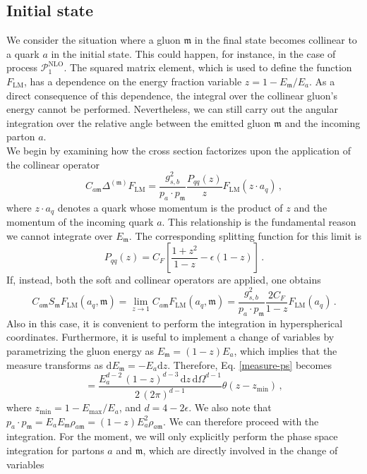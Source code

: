 \documentclass[a4paper, 12pt]{book}
\newcommand{\um}{\mathfrak{m}}
\begin{document}
\subsection{Initial state}
We consider the situation where a gluon $\um$ in the final state becomes collinear to a quark $a$ in the initial state. This could happen, for instance, in the case of process $\mathcal{P}_1^{\mathrm{NLO}}$. The squared matrix element, which is used to define the function $F_{\mathrm{LM}}$, has a dependence on the energy fraction variable $z=1-E_\um/E_a$. As a direct consequence of this dependence, the integral over the collinear gluon's energy cannot be performed. Nevertheless, we can still carry out the angular integration over the relative angle between the emitted gluon $\um$ and the incoming parton $a$. \\
We begin by examining how the cross section factorizes upon the application of the collinear operator
\begin{equation}
  C_{a\um} \Delta^{(\um)} F_{\mathrm{LM}} = \frac{g^2_{s,b}}{p_a \cdot p_\um} \frac{P_{qq}(z)}{z} F_{\mathrm{LM}}(z\cdot a_q) \, ,
\end{equation}
where $z \cdot a_q$ denotes a quark whose momentum is the product of $z$ and the momentum of the incoming quark $a$. This relationship is the fundamental reason we cannot integrate over $E_\um$. The corresponding splitting function for this limit is
\begin{equation}
  P_{qq}(z) = C_F \left[\frac{1+z^2}{1-z}-\epsilon(1-z)\right]\, .
\end{equation}
If, instead, both the soft and collinear operators are applied, one obtains
\begin{equation}
  C_{a\um} S_{\um} F_{\mathrm{LM}} (a_q, \um) = \lim_{z \to 1}  C_{a\um} F_{\mathrm{LM}} (a_q, \um)= \frac{g^2_{s,b}}{p_a \cdot p_\um} \frac{2 C_F}{1-z} F_{\mathrm{LM}}( a_q) \, .
\end{equation}
Also in this case, it is convenient to perform the integration in hyperspherical coordinates. Furthermore, it is useful to implement a change of variables by parametrizing the gluon energy as $E_\um = (1-z)E_a$, which implies that the measure transforms as $\mathrm{d}E_\um=-E_a \mathrm{d}z$. Therefore, Eq. \ref{measure-ps} becomes
\begin{equation}
  [\mathrm{d}p_\um] = \frac{E_a^{d-2}\, (1-z)^{d-3} \, \mathrm{d}z \, \mathrm{d}\Omega ^{d-1}}{2 \, (2\pi)^{d-1}} \theta(z-z_{\mathrm{min}}) \, ,
\end{equation}
where $z_{\mathrm{min}} = 1 - E_{\mathrm{max}}/E_a$, and $d=4-2\epsilon$. We also note that $p_a \cdot p_\um = E_a E_\um \rho_{a\um}=(1-z)E_a^2\rho_{a \um}$. We can therefore proceed with the integration. For the moment, we will only explicitly perform the phase space integration for partons $a$ and $\um$, which are directly involved in the change of variables
\end{document}
